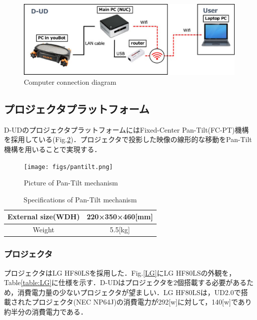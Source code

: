 \documentclass[12pt]{sonota/aislab}
\begin{document}
\begin{figure}[h]
\begin{center}
\includegraphics[clip, width=12cm]{figs/configuration.eps}
\caption{Computer connection diagram}
\label{computer_connection}
\end{center}
\end{figure}

\subsection{プロジェクタプラットフォーム}
D-UDのプロジェクタプラットフォームにはFixed-Center Pan-Tilt(FC-PT)機構を採用している(Fig.\ref{pantilt})\cite{pantilt}．プロジェクタで投影した映像の線形的な移動をPan-Tilt機構を用いることで実現する．

\begin{figure}[h]
\begin{center}
\texttt{[image: figs/pantilt.png]}
\caption{Picture of Pan-Tilt mechanism}
\label{pantilt}
\end{center}
\end{figure}

\begin{table}[h]
	\caption{Specifications of Pan-Tilt mechanism}
	\label{table:pantilt}
	\centering 
	\begin{tabular}[tbp]{|c|c|}
		\hline 
		External size(WDH) & 220×350×460[mm] \\\hline
		Weight & 5.5[kg] \\\hline
	\end{tabular}
\end{table}

\subsubsection{プロジェクタ}
プロジェクタはLG HF80LSを採用した．Fig.\ref{LG}にLG HF80LSの外観を，Table\ref{table:LG}に仕様を示す．D-UDはプロジェクタを2個搭載する必要があるため，消費電力量の少ないプロジェクタが望ましい．LG HF80LSは，UD2.0で搭載されたプロジェクタ(NEC NP64J)の消費電力が292[w]に対して，140[w]であり約半分の消費電力である．
\end{document}
